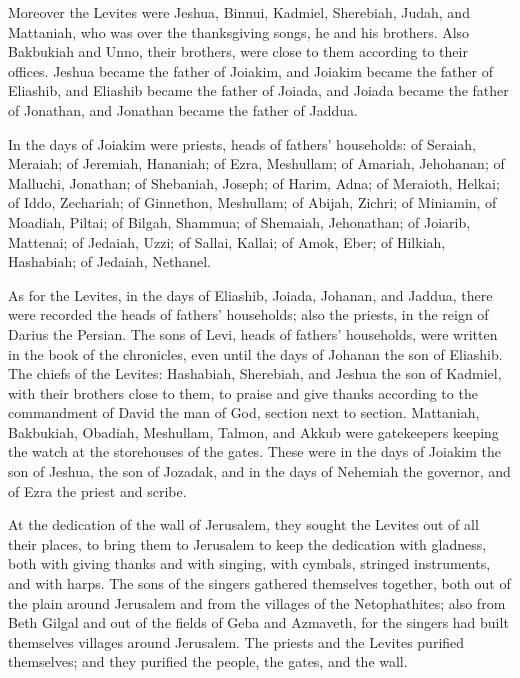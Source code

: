  Moreover the Levites were Jeshua, Binnui, Kadmiel,
Sherebiah, Judah, and Mattaniah, who was over the thanksgiving songs, he
and his brothers.  Also Bakbukiah and Unno, their brothers,
were close to them according to their offices.  Jeshua
became the father of Joiakim, and Joiakim became the father of Eliashib,
and Eliashib became the father of Joiada,  and Joiada
became the father of Jonathan, and Jonathan became the father of Jaddua.

 In the days of Joiakim were priests, heads of fathers'
households: of Seraiah, Meraiah; of Jeremiah, Hananiah;  of
Ezra, Meshullam; of Amariah, Jehohanan;  of Malluchi,
Jonathan; of Shebaniah, Joseph;  of Harim, Adna; of
Meraioth, Helkai;  of Iddo, Zechariah; of Ginnethon,
Meshullam;  of Abijah, Zichri; of Miniamin, of Moadiah,
Piltai;  of Bilgah, Shammua; of Shemaiah, Jehonathan;
 of Joiarib, Mattenai; of Jedaiah, Uzzi;  of
Sallai, Kallai; of Amok, Eber;  of Hilkiah, Hashabiah; of
Jedaiah, Nethanel.

 As for the Levites, in the days of Eliashib, Joiada,
Johanan, and Jaddua, there were recorded the heads of fathers'
households; also the priests, in the reign of Darius the Persian.
 The sons of Levi, heads of fathers' households, were
written in the book of the chronicles, even until the days of Johanan
the son of Eliashib.  The chiefs of the Levites: Hashabiah,
Sherebiah, and Jeshua the son of Kadmiel, with their brothers close to
them, to praise and give thanks according to the commandment of David
the man of God, section next to section.  Mattaniah,
Bakbukiah, Obadiah, Meshullam, Talmon, and Akkub were gatekeepers
keeping the watch at the storehouses of the gates.  These
were in the days of Joiakim the son of Jeshua, the son of Jozadak, and
in the days of Nehemiah the governor, and of Ezra the priest and scribe.

 At the dedication of the wall of Jerusalem, they sought
the Levites out of all their places, to bring them to Jerusalem to keep
the dedication with gladness, both with giving thanks and with singing,
with cymbals, stringed instruments, and with harps.  The
sons of the singers gathered themselves together, both out of the plain
around Jerusalem and from the villages of the Netophathites;
 also from Beth Gilgal and out of the fields of Geba and
Azmaveth, for the singers had built themselves villages around
Jerusalem.  The priests and the Levites purified
themselves; and they purified the people, the gates, and the wall.

